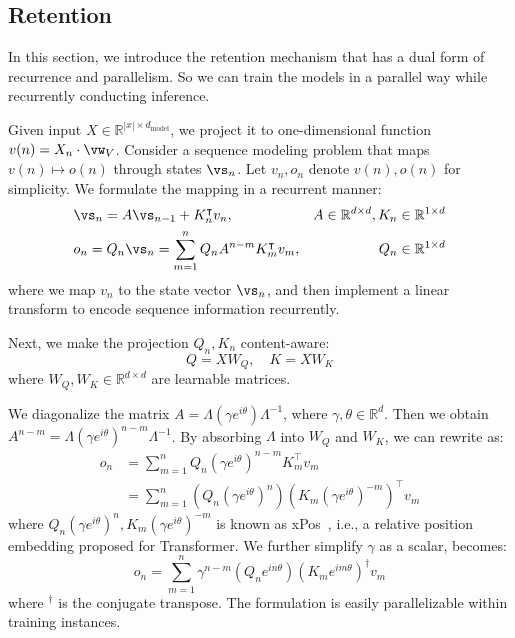 \documentclass{article}
\begin{document}
\subsection{Retention}
\label{sec:retention}

In this section, we introduce the retention mechanism that has a dual form of recurrence and parallelism.
So we can train the models in a parallel way while recurrently conducting inference.

Given input $X \in \mathbb{R}^{|x|\times d_\text{model}}$, we project it to one-dimensional function $v(n) = X_n \cdot \vw_V$.
Consider a sequence modeling problem that maps $v(n) \mapsto o(n)$ through states $\vs_n$. Let $v_n, o_n$ denote $v(n), o(n)$ for simplicity.
We formulate the mapping in a recurrent manner:
\begin{equation}
\begin{aligned}
\label{eq:rnn}
&\vs_n = A\vs_{n-1} + K_n^\intercal v_n, &A\in\mathbb{R}^{d\times d}, K_n\in\mathbb{R}^{1\times d} \\
&o_n = Q_n\vs_n = \sum_{m=1}^n Q_n A^{n - m} K_m^\intercal v_m, &Q_n\in\mathbb{R}^{1\times d}
\end{aligned}
\end{equation}
where we map $v_n$ to the state vector $\vs_n$, and then implement a linear transform to encode sequence information recurrently.

Next, we make the projection $Q_n, K_n$ content-aware:
\begin{equation}
\label{eq:content:aware}
Q = X W_Q, \quad K = X W_K
\end{equation}
where $W_Q, W_K \in \mathbb{R}^{d\times d}$ are learnable matrices.

We diagonalize the matrix $A = \Lambda(\gamma e^{i \theta})\Lambda^{-1}$, where $\gamma, \theta \in \mathbb{R}^d$.
Then we obtain $A^{n - m} = \Lambda (\gamma e^{i\theta})^{n - m} \Lambda^{-1}$.
By absorbing $\Lambda$ into $W_Q$ and $W_K$, we can rewrite  as:
\begin{equation}
\begin{aligned}
\label{eq:ret:xpos}
o_n &= \sum_{m=1}^n Q_n (\gamma e^{i\theta})^{n - m}  K_m^\intercal v_m \\
&=\sum_{m=1}^n(Q_n(\gamma e^{i\theta})^n)(K_m(\gamma e^{i\theta})^{-m})^\intercal v_m
\end{aligned}
\end{equation}
where $Q_n(\gamma e^{i\theta})^n, K_m(\gamma e^{i\theta})^{-m}$ is known as xPos~\cite{lex}, i.e., a relative position embedding proposed for Transformer.
% 
We further simplify $\gamma$ as a scalar,  becomes:
\begin{equation}
\label{eq:ret:element}
o_n = \sum_{m=1}^n \gamma^{n-m} (Q_n e^{in\theta})(K_m e^{im\theta})^\dag v_m
\end{equation}
where $^\dag$ is the conjugate transpose.
The formulation is easily parallelizable within training instances.
\end{document}
